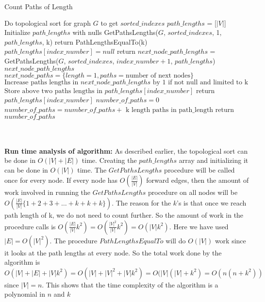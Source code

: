 \documentclass[addpoints]{exam}
\begin{document}
\begin{questions}
\begin{parts}
\begin{minipage}{\linewidth}
  \begin{algorithm}[H]
    \caption{Count Paths of Length}\label{}
    \begin{algorithmic}[1]
    	\State Do topological sort for graph $G$ to get $sorted\_indexes$
	\State $path\_lengths$ = [$|V|$] 
	\State Initialize $path\_lengths$ with nulls
      	\State GetPathsLengths($G$, $sorted\_indexes$, 1, $path\_lengths$, k)
	\State return PathLengthsEqualTo(k)
      \EndProcedure
	 
		\State $path\_lengths[index\_number] = null$
		\State return
	\EndIf
    	\State $next\_node\_path\_lengths$ 
      	\State \text{         } = GetPathsLengths($G$, $sorted\_indexes$, $index\_number+1$, $path\_lengths$)
	\State {} $next\_node\_path\_lengths$  
      	\State $next\_node\_paths =\{length=1, paths = \text{number of next nodes}\}$
      	\State $\text{Increase paths lengths in } next\_node\_path\_lengths \text{ by 1} \text{ if not null and limited to k}$ 
      	\State $\text{Store above two paths lengths in }path\_lengths[index\_number] $ 
	\State return $path\_lengths[index\_number] $
      \EndProcedure    
      	\State $number\_of\_paths = 0$
		\State $number\_of\_paths = number\_of\_paths + \text{ k length paths in path\_length} $
	\EndFor
      	\State return $number\_of\_paths$
      \EndProcedure    
     \end{algorithmic}
  \end{algorithm}
\end{minipage}\\\\

\textbf{Run time analysis of algorithm: } As described earlier, the topological sort can be done in $O(|V| + |E|)$ time. Creating the $path\_lengths$ array and initializing it can be done in $O(|V|)$ time. The $GetPathsLengths$ procedure will be called once for every node. If every node has $O(\frac{|E|}{|V|})$ forward edges, then the amount of work involved in running the $GetPathsLengths$ procedure on all nodes will be $O(\frac{|E|}{|V|}\{1+2+3+\ldots+k+k+k\})$. The reason for the $k$'s is that once we reach path length of k, we do not need to count further. So the amount of work in the procedure calls is $O(\frac{|E|}{|V|}k^2) = O(\frac{|V|^2}{|V|}k^2)= O(|V|k^2)$. Here we have used $|E| = O(|V|^2)$. The procedure $PathLengthsEqualTo$ will do $O(|V|)$ work since it looks at the path lengths at every node. So the total work done by the algorithm is $O(|V| + |E| + |V|k^2) = O(|V| + |V|^2 + |V|k^2) = O(|V|(|V|+k^2) = O(n(n+k^2))$ since $|V| = n$. This shows that the time complexity of the algorithm is a polynomial in $n$ and $k$


\end{parts}
\end{questions}
\end{document}
